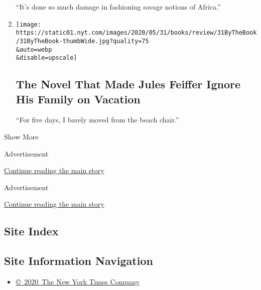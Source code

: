\begin{enumerate}
  ``It's done so much damage in fashioning savage notions of Africa.''
\item
  \href{/2020/05/28/books/review/jules-feiffer-by-the-book-interview.html}{}

  \texttt{[image: https://static01.nyt.com/images/2020/05/31/books/review/31ByTheBook/31ByTheBook-thumbWide.jpg?quality=75\\\&auto=webp\\\&disable=upscale]}

  \hypertarget{the-novel-that-made-jules-feiffer-ignore-his-family-on-vacation}{%
  \subsection{The Novel That Made Jules Feiffer Ignore His Family on
  Vacation}\label{the-novel-that-made-jules-feiffer-ignore-his-family-on-vacation}}

  ``For five days, I barely moved from the beach chair.''
\end{enumerate}

Show More

Advertisement

\protect\hyperlink{after-mid1}{Continue reading the main story}

Advertisement

\protect\hyperlink{after-mktg}{Continue reading the main story}

\hypertarget{site-index}{%
\subsection{Site Index}\label{site-index}}

\hypertarget{site-information-navigation}{%
\subsection{Site Information
Navigation}\label{site-information-navigation}}

\begin{itemize}
\tightlist
\item
  \href{https://help.nytimes.com/hc/en-us/articles/115014792127-Copyright-notice}{©~2020~The
  New York Times Company}
\end{itemize}

